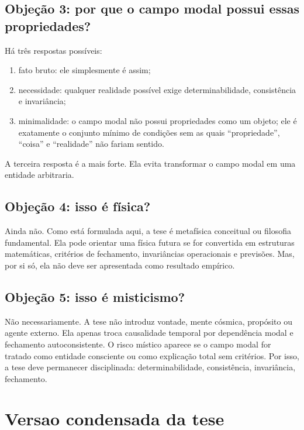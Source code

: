 \documentclass[11pt,a4paper]{article}
\begin{document}
\subsection{Objeção 3: por que o campo modal possui essas propriedades?}

Há três respostas possíveis:

\begin{enumerate}
    \item fato bruto: ele simplesmente é assim;
    \item necessidade: qualquer realidade possível exige determinabilidade, consistência e invariância;
    \item minimalidade: o campo modal não possui propriedades como um objeto; ele é exatamente o conjunto mínimo de condições sem as quais ``propriedade'', ``coisa'' e ``realidade'' não fariam sentido.
\end{enumerate}

A terceira resposta é a mais forte. Ela evita transformar o campo modal em uma entidade arbitraria.

\subsection{Objeção 4: isso é física?}

Ainda não. Como está formulada aqui, a tese é metafísica conceitual ou filosofia fundamental. Ela pode orientar uma física futura se for convertida em estruturas matemáticas, critérios de fechamento, invariâncias operacionais e previsões. Mas, por si só, ela não deve ser apresentada como resultado empírico.

\subsection{Objeção 5: isso é misticismo?}

Não necessariamente. A tese não introduz vontade, mente cósmica, propósito ou agente externo. Ela apenas troca causalidade temporal por dependência modal e fechamento autoconsistente. O risco místico aparece se o campo modal for tratado como entidade consciente ou como explicação total sem critérios. Por isso, a tese deve permanecer disciplinada: determinabilidade, consistência, invariância, fechamento.

\section{Versao condensada da tese}
\end{document}

